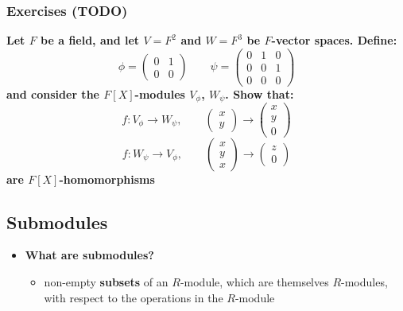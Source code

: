 \documentclass{exam}
\begin{document}
\subsubsection{Exercises (TODO)}

\begin{questions}

\question \textbf{Let $F$ be a field, and let $V = F^2$ and $W = F^3$ be $F$-vector spaces. Define:
\[
\phi = \begin{pmatrix}
0 & 1 \\
0 & 0
\end{pmatrix}
\qquad 
\psi = \begin{pmatrix}
0 & 1 & 0 \\
0 & 0 & 1 \\
0 & 0 & 0
\end{pmatrix}
\]
and consider the $F[X]$-modules $V_\phi$, $W_\psi$. Show that:
\[
f : V_\phi \to W_\psi, \qquad \begin{pmatrix}
x \\
y
\end{pmatrix}
\to 
\begin{pmatrix}
x \\
y \\
0
\end{pmatrix}
\]
\[
f : W_\psi \to V_\phi, \qquad \begin{pmatrix}
x \\
y \\
x
\end{pmatrix}
\to 
\begin{pmatrix}
z \\
0 
\end{pmatrix}
\]
are $F[X]$-homomorphisms}

\end{questions}

\subsection{Submodules}

\begin{itemize}
    \item \textbf{What are submodules?}
    \begin{itemize}
        \item non-empty \textbf{subsets} of an $R$-module, which are themselves $R$-modules, with respect to the operations in the $R$-module
    \end{itemize}
\end{itemize}
\end{document}
